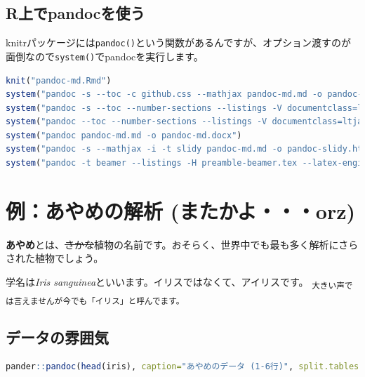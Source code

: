\documentclass[]{ltjarticle}
\begin{document}
\subsection{R上でpandocを使う}\label{rux4e0aux3067pandocux3092ux4f7fux3046}

knitrパッケージには\lstinline!pandoc()!という関数があるんですが、オプション渡すのが面倒なので\lstinline!system()!でpandocを実行します。

\begin{lstlisting}[language=R]
knit("pandoc-md.Rmd")
system("pandoc -s --toc -c github.css --mathjax pandoc-md.md -o pandoc-md.html")
system("pandoc -s --toc --number-sections --listings -V documentclass=ltjarticle -H preamble.tex pandoc-md.md -o pandoc-md.tex")
system("pandoc --toc --number-sections --listings -V documentclass=ltjarticle --latex-engine=lualatex -H preamble.tex pandoc-md.md -o pandoc-md.pdf")
system("pandoc pandoc-md.md -o pandoc-md.docx")
system("pandoc -s --mathjax -i -t slidy pandoc-md.md -o pandoc-slidy.html")
system("pandoc -t beamer --listings -H preamble-beamer.tex --latex-engine=lualatex pandoc-md.md -o pandoc-beamer.pdf")
\end{lstlisting}

\section{例：あやめの解析
(またかよ・・・orz)}\label{ux4f8bux3042ux3084ux3081ux306eux89e3ux6790-ux307eux305fux304bux3088orz}

\textbf{あやめ}とは、\sout{さかな}植物の名前です。おそらく、世界中でも最も多く解析にさらされた植物でしょう。

学名は\emph{Iris sanguinea}といいます。イリスではなくて、アイリスです。
\textsubscript{大きい声では言えませんが今でも「イリス」と呼んでます。}

\subsection{データの雰囲気}\label{ux30c7ux30fcux30bfux306eux96f0ux56f2ux6c17}

\begin{lstlisting}[language=R]
pander::pandoc(head(iris), caption="あやめのデータ (1-6行)", split.tables = 100)
\end{lstlisting}
\end{document}
